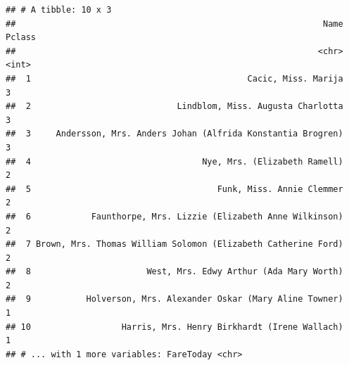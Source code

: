 \documentclass[]{book}
\newenvironment{Shaded}{\begin{snugshade}}{\end{snugshade}}
\newcommand{\KeywordTok}[1]{\textcolor[rgb]{0.13,0.29,0.53}{\textbf{#1}}}
\newcommand{\DataTypeTok}[1]{\textcolor[rgb]{0.13,0.29,0.53}{#1}}
\newcommand{\DecValTok}[1]{\textcolor[rgb]{0.00,0.00,0.81}{#1}}
\newcommand{\FloatTok}[1]{\textcolor[rgb]{0.00,0.00,0.81}{#1}}
\newcommand{\StringTok}[1]{\textcolor[rgb]{0.31,0.60,0.02}{#1}}
\newcommand{\CommentTok}[1]{\textcolor[rgb]{0.56,0.35,0.01}{\textit{#1}}}
\newcommand{\OperatorTok}[1]{\textcolor[rgb]{0.81,0.36,0.00}{\textbf{#1}}}
\newcommand{\NormalTok}[1]{#1}
\theoremstyle{definition}
\theoremstyle{definition}
\theoremstyle{definition}
\theoremstyle{remark}
\begin{document}
\begin{Shaded}
\end{Shaded}

\begin{verbatim}
## # A tibble: 10 x 3
##                                                             Name Pclass
##                                                            <chr>  <int>
##  1                                           Cacic, Miss. Marija      3
##  2                             Lindblom, Miss. Augusta Charlotta      3
##  3     Andersson, Mrs. Anders Johan (Alfrida Konstantia Brogren)      3
##  4                                  Nye, Mrs. (Elizabeth Ramell)      2
##  5                                     Funk, Miss. Annie Clemmer      2
##  6            Faunthorpe, Mrs. Lizzie (Elizabeth Anne Wilkinson)      2
##  7 Brown, Mrs. Thomas William Solomon (Elizabeth Catherine Ford)      2
##  8                       West, Mrs. Edwy Arthur (Ada Mary Worth)      2
##  9           Holverson, Mrs. Alexander Oskar (Mary Aline Towner)      1
## 10                  Harris, Mrs. Henry Birkhardt (Irene Wallach)      1
## # ... with 1 more variables: FareToday <chr>
\end{verbatim}
\end{document}
